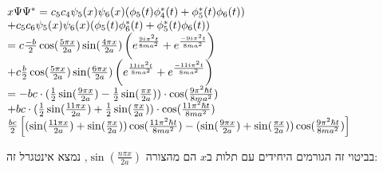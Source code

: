 \documentclass[14pt]{extarticle}
\makeatletter
\newenvironment{lefteqs}{%
    \begin{english}%
    \begin{flushleft}%
    \renewcommand{\arraystretch}{1.3}%
    $\begin{array}{@{}l@{}}%
}{%
    \end{array}$%
    \end{flushleft}%
    \end{english}%
}
\makeatother
\begin{document}
\begin{lefteqs}
    x\Psi \Psi^{*} = c_5 c_4 \psi_5(x) \psi_6(x) (\phi_5(t)\phi_4^{*}(t) + \phi_5^{*}(t)\phi_6(t)) \\
    + c_5 c_6 \psi_5(x) \psi_6(x) (\phi_5(t)\phi_6^{*}(t) + \phi_5^{*}(t)\phi_6(t)) \\
    = c \frac{-b}{2} \cos(\frac{5\pi x}{2a}) \sin(\frac{4\pi x}{2a})\left( e^{\frac{9i\pi^2t}{8ma^2}} +  e^{\frac{-9i\pi^2t}{8ma^2}} \right) \\
    + c \frac{b}{2} \cos(\frac{5\pi x}{2a}) \sin(\frac{6\pi x}{2a})\left( e^{\frac{11i\pi^2t}{8ma^2}} +  e^{\frac{-11i\pi^2t}{8ma^2}} \right) \\
    = -bc \cdot (\frac{1}{2} \sin(\frac{9\pi x}{2a}) - \frac{1}{2} \sin(\frac{\pi x}{2a})) \cdot \cos(\frac{9\pi^2 \hbar t}{8ma^2}) \\
    + bc \cdot (\frac{1}{2} \sin(\frac{11\pi x}{2a}) + \frac{1}{2} \sin(\frac{\pi x}{2a})) \cdot \cos(\frac{11\pi^2 \hbar t}{8ma^2}) \\
    \frac{bc}{2} \left[ (\sin(\frac{11\pi x}{2a}) +  \sin(\frac{\pi x}{2a})) \cos(\frac{11\pi^2 \hbar t}{8ma^2}) - (\sin(\frac{9\pi x}{2a}) + \sin(\frac{\pi x}{2a}))\cos(\frac{9\pi^2 \hbar t}{8ma^2}) \right]

\end{lefteqs}
בביטוי זה הגורמים היחידים עם תלות ב$x$ הם מהצורה $\sin(\frac{n\pi x}{2a})$, נמצא אינטגרל זה:
\end{document}
